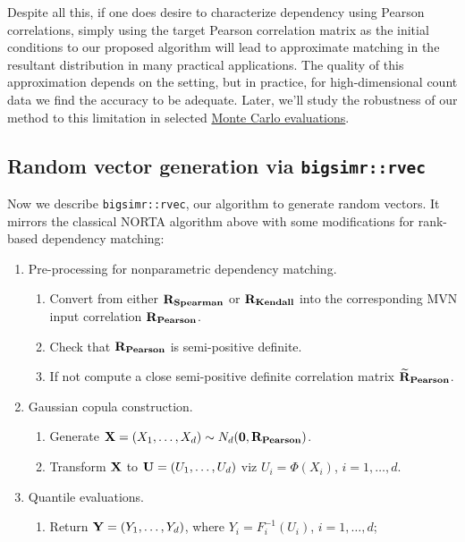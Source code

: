 \documentclass[]{article}
\providecommand{\tightlist}{%
  \setlength{\itemsep}{0pt}\setlength{\parskip}{0pt}}
\begin{document}
Despite all this, if one does desire to characterize dependency using Pearson correlations, simply using the target Pearson correlation matrix as the initial conditions to our proposed algorithm will lead to approximate matching in the resultant distribution \citep{Song00} in many practical applications.
The quality of this approximation depends on the setting, but in practice, for high-dimensional count data we find the accuracy to be adequate.
Later, we'll study the robustness of our method to this limitation in selected \href{\%7B\#simulations\%7D}{Monte Carlo evaluations}.

\hypertarget{rand-vec-gen}{%
\subsection{\texorpdfstring{Random vector generation via \texttt{bigsimr::rvec}}{Random vector generation via bigsimr::rvec}}\label{rand-vec-gen}}

Now we describe \texttt{bigsimr::rvec}, our algorithm to generate random vectors.
It mirrors the classical NORTA algorithm above with some modifications for rank-based dependency matching:

\begin{enumerate}
\def\labelenumi{\arabic{enumi}.}
\tightlist
\item
  Pre-processing for nonparametric dependency matching.

  \begin{enumerate}
  \def\labelenumii{(\roman{enumii})}
  \tightlist
  \item
    Convert from either \({\bf R_{Spearman}}\) or \({\bf R_{Kendall}}\) into the corresponding MVN input correlation \({\bf R_{Pearson}}\).
  \item
    Check that \({\bf R_{Pearson}}\) is semi-positive definite.\\
  \item
    If not compute a close semi-positive definite correlation matrix \({\bf \widetilde{R}_{Pearson}}\).\\
  \end{enumerate}
\item
  Gaussian copula construction.

  \begin{enumerate}
  \def\labelenumii{(\roman{enumii})}
  \tightlist
  \item
    Generate \({\bf X}=(X_1, \ldots, X_d) \sim N_d({\bf 0}, {\bf R_{Pearson}})\).\\
  \item
    Transform \({\bf X}\) to \({\bf U} = (U_1, \ldots, U_d)\) viz \(U_i=\Phi(X_i)\), \(i=1, \ldots, d\).\\
  \end{enumerate}
\item
  Quantile evaluations.

  \begin{enumerate}
  \def\labelenumii{(\roman{enumii})}
  \tightlist
  \item
    Return \({\bf Y} = (Y_1, \ldots, Y_d)\), where \(Y_i=F_i^{-1}(U_i)\), \(i=1, \ldots, d\);
  \end{enumerate}
\end{enumerate}
\end{document}
